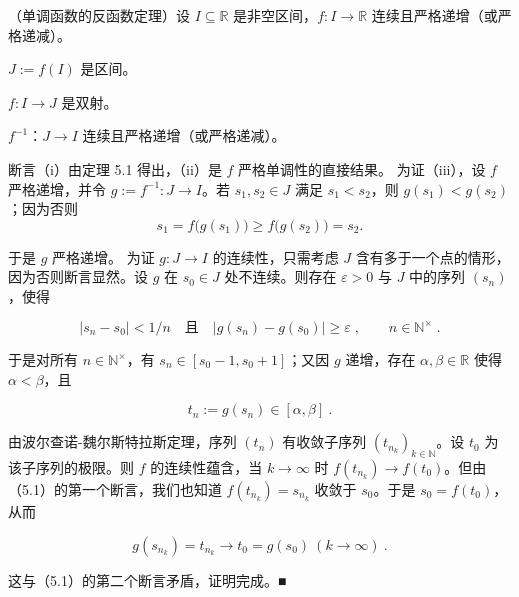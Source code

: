 \begin{theorem}

（单调函数的反函数定理）设 $ I \subseteq \mathbb{R} $ 是非空区间，$ f: I \to \mathbb{R} $ 连续且严格递增（或严格递减）。

\begin{subitems}
\item

$ J := f(I) $ 是区间。

\item

$f: I \to J$ 是双射。

\item

$ f^{-1} $：$ J \to I $ 连续且严格递增（或严格递减）。

\proofhead
断言（i）由定理 5.1 得出，（ii）是 $ f $ 严格单调性的直接结果。
为证（iii），设 $f$ 严格递增，并令 $g := f^{-1} : J \to I$。若 $s_1, s_2 \in J$ 满足 $s_1 < s_2$，则 $g(s_1) < g(s_2)$；因为否则
\[
s_{1}=f\big(g(s_{1})\big)\geq f\big(g(s_{2})\big)=s_{2}.
\]

于是 $ g $ 严格递增。
为证 $ g: J \to I $ 的连续性，只需考虑 $ J $ 含有多于一个点的情形，因为否则断言显然。设 $ g $ 在 $ s_0 \in J $ 处不连续。则存在 $ \varepsilon > 0 $ 与 $ J $ 中的序列 $ (s_n) $，使得

\begin{equation}
|s_{n}-s_{0}|<1/n\quad\text{且}\quad|g(s_{n})-g(s_{0})|\geq\varepsilon\;,\qquad n\in\mathbb{N}^{\times}\;.
\end{equation}

于是对所有 $ n \in \mathbb{N}^\times $，有 $ s_n \in [s_0 - 1, s_0 + 1] $；又因 $ g $ 递增，存在 $ \alpha, \beta \in \mathbb{R} $ 使得 $ \alpha < \beta $，且

\[
t_{n}:=g(s_{n})\in[\alpha,\beta]~.
\]

由波尔查诺-魏尔斯特拉斯定理，序列 $(t_n)$ 有收敛子序列 $(t_{n_k})_{k\in\mathbb{N}}$。设 $t_0$ 为该子序列的极限。则 $f$ 的连续性蕴含，当 $k \to \infty$ 时 $f(t_{n_k}) \to f(t_0)$。但由（5.1）的第一个断言，我们也知道 $f(t_{n_k}) = s_{n_k}$ 收敛于 $s_0$。于是 $s_0 = f(t_0)$，从而

\[
g(s_{n_{k}})=t_{n_{k}}\to t_{0}=g(s_{0})\ (k\to\infty)~.
\]

这与（5.1）的第二个断言矛盾，证明完成。■

\end{subitems}

\end{theorem}

